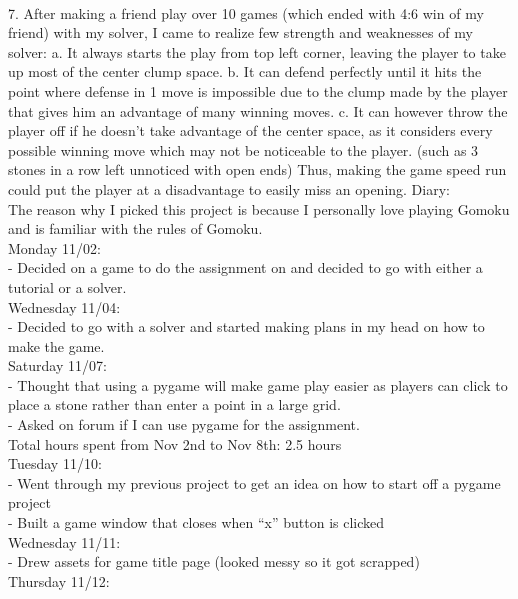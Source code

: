 \documentclass[a4paper]{article}
\begin{document}
\newline \\
7.	After making a friend play over 10 games (which ended with 4:6 win of my friend) with my solver, I came to realize few strength and weaknesses of my solver:
	a.	It always starts the play from top left corner, leaving the player to take up most of the center clump space.
	b.	It can defend perfectly until it hits the point where defense in 1 move is impossible due to the clump made by the player that gives him an advantage of many winning moves.
	c.	It can however throw the player off if he doesn’t take advantage of the center space, as it considers every possible winning move which may not be noticeable to the player. (such as 3 stones in a row left unnoticed with open ends) Thus, making the game speed run could put the player at a disadvantage to easily miss an opening.
\newpage
\noindent Diary:\\
The reason why I picked this project is because I personally love playing Gomoku and is familiar with the rules of Gomoku.\\
\newline
Monday 11/02:\\
\indent -	Decided on a game to do the assignment on and decided to go with either a tutorial or a solver.\\
Wednesday 11/04:\\
\indent -	Decided to go with a solver and started making plans in my head on how to make the game.\\
Saturday 11/07:\\
\indent -	Thought that using a pygame will make game play easier as players can click to place a stone rather than enter a point in a large grid.\\
\indent -	Asked on forum if I can use pygame for the assignment.
\newline\\
Total hours spent from Nov 2nd to Nov 8th: 2.5 hours
\newline\\
Tuesday 11/10:\\
\indent -	Went through my previous project to get an idea on how to start off a pygame project\\
\indent -	Built a game window that closes when “x” button is clicked\\
Wednesday 11/11:\\
\indent -	Drew assets for game title page (looked messy so it got scrapped)\\
Thursday 11/12:\\
\end{document}
